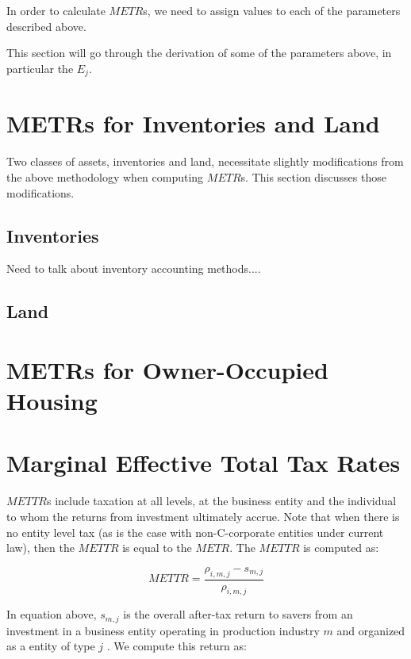\documentclass[article,11pt,letterpaper,fleqn]{article}
\theoremstyle{definition}
\numberwithin{equation}{section}
\begin{document}
In order to calculate $METR$s, we need to assign values to each of the parameters described above.  

This section will go through the derivation of some of the parameters above, in particular the $E_{j}$.


\section{METRs for Inventories and Land}

Two classes of assets, inventories and land, necessitate slightly modifications from the above methodology when computing $METR$s.  This section discusses those modifications.

\subsection{Inventories}

Need to talk about inventory accounting methods....

\subsection{Land}



\section{METRs for Owner-Occupied Housing}

\section{Marginal Effective Total Tax Rates}

$METTR$s include taxation at all levels, at the business entity and the individual to whom the returns from investment ultimately accrue.  Note that when there is no entity level tax (as is the case with non-C-corporate entities under current law), then the $METTR$ is equal to the $METR$.  The $METTR$ is computed as:

\begin{equation}
METTR = \frac{\rho_{i,m,j}-s_{m,j}}{\rho_{i,m,j}}
\end{equation}

\noindent\noindent In equation above, $s_{m,j}$ is the overall after-tax return to savers from an investment in a business entity operating in production industry $m$ and organized as a entity of type $j$ .  We compute this return as:
\end{document}

